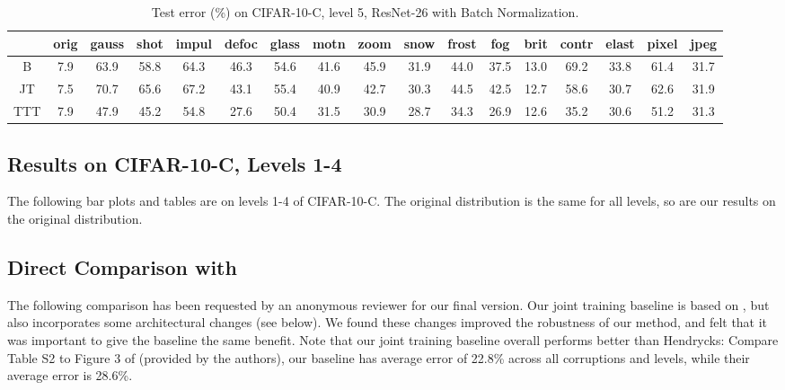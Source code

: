 \documentclass{article}
\theoremstyle{plain}
\theoremstyle{remark}
\theoremstyle{definition}
\begin{document}
\begin{table}[ht]
	\footnotesize
	\begin{center}
		{
			\setlength\tabcolsep{3.5pt}
			\begin{tabular}{c|c|c|c|c|c|c|c|c|c|c|c|c|c|c|c|c}
				\hline
				& orig& gauss& shot& impul& defoc& glass& motn& zoom& snow& frost& fog& brit& contr& elast& pixel& jpeg\\
				\hline
				B & 7.9& 63.9& 58.8& 64.3& 46.3& 54.6& 41.6& 45.9& 31.9& 44.0& 37.5& 13.0& 69.2& 33.8& 61.4& 31.7\\
				\hline
				JT & 7.5& 70.7& 65.6& 67.2& 43.1& 55.4& 40.9& 42.7& 30.3& 44.5& 42.5& 12.7& 58.6& 30.7& 62.6& 31.9\\
				\hline
				TTT & 7.9& 47.9& 45.2& 54.8& 27.6& 50.4& 31.5& 30.9& 28.7& 34.3& 26.9& 12.6& 35.2& 30.6& 51.2& 31.3\\
				\hline
			\end{tabular}
		}
	\end{center}
	\vspace{-2ex}
	\caption{
		Test error (\%) on CIFAR-10-C, level 5, ResNet-26 with Batch Normalization.
	}
	\label{table:bn}
\end{table} 

\subsection{Results on CIFAR-10-C, Levels 1-4}
The following bar plots and tables are on levels 1-4 of CIFAR-10-C.
The original distribution is the same for all levels, so are our results on the original distribution.

\subsection{Direct Comparison with \citet{hendrycks2019using}}
\label{reviewer_stuff}
The following comparison has been requested by an anonymous reviewer for our final version.
Our joint training baseline is based on \citet{hendrycks2019using}, but also incorporates some architectural changes (see below). We found these changes improved the robustness of our method, and felt that it was important to give the baseline the same benefit. Note that our joint training baseline overall performs better than Hendrycks: Compare Table S2 to Figure 3 of \citet{hendrycks2019using} (provided by the authors), our baseline has average error of 22.8\% across all corruptions and levels, while their average error is 28.6\%. 
\end{document}
